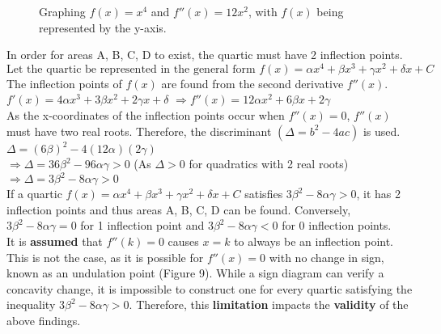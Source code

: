 \documentclass{homework}
\begin{document}
\begin{flushleft}
\begin{paracol}{2}
\begin{figure}[htp]
        \caption{Graphing $f(x)=x^4$ and $f''(x)=12x^2$, with $f(x)$ being represented by the y-axis.}
        \label{fig:g11}
    \end{figure}
\end{paracol}
\newpage
In order for areas A, B, C, D to exist, the quartic must have 2 inflection points. \vspace{1em} \\
    $\text{Let the quartic be represented in the general form }f(x)=\alpha x^4+\beta x^3+\gamma x^2+\delta x+C$ \vspace{0.7em}\\
    The inflection points of $f(x)$ are found from the second derivative $f''(x)$. \vspace{0.7em}\\
    $f'(x)=4\alpha x^3+3\beta x^2+2\gamma x +\delta$ \hspace{4em}
    $\Rightarrow f''(x)=12\alpha x^2+6\beta x+2\gamma $ \vspace{0.8em}\\
    As the x-coordinates of the inflection points occur when $f''(x)=0$, $f''(x)$ must have two real roots. Therefore, the discriminant $(\Delta=b^2-4ac)$ is used. \vspace{0.8em} \\
    $\Delta=(6\beta)^2-4(12\alpha)(2\gamma)$ \vspace{0.8em} \\
    $\Rightarrow \Delta=36\beta^2-96\alpha \gamma>0$ \hspace{3em}(As $\Delta>0$ for quadratics with 2 real roots) \vspace{0.8em} \\
    $\Rightarrow \Delta=3\beta^2-8\alpha \gamma>0$ \vspace{0.8em} \\
    If a quartic $f(x)=\alpha x^4+\beta x^3+\gamma x^2+\delta x+C$ satisfies $3\beta^2-8\alpha \gamma>0$, it has 2 inflection points and thus areas A, B, C, D can be found. Conversely, $ 3\beta^2-8\alpha \gamma=0$ for 1 inflection point and $3\beta^2-8\alpha \gamma<0$ for 0 inflection points. \vspace{0.8em} \\
It is \textbf{assumed} that $f''(k)=0$ causes $x=k$ to always be an inflection point. This is not the case, as it is possible for $f''(x)=0$ with no change in sign, known as an undulation point (Figure 9). While a sign diagram can verify a concavity change, it is impossible to construct one for every quartic satisfying the inequality $3\beta^2-8\alpha \gamma>0$. Therefore, this \textbf{limitation} impacts the \textbf{validity} of the above findings. \vspace{0.8em} \\

\end{flushleft}
\end{document}
